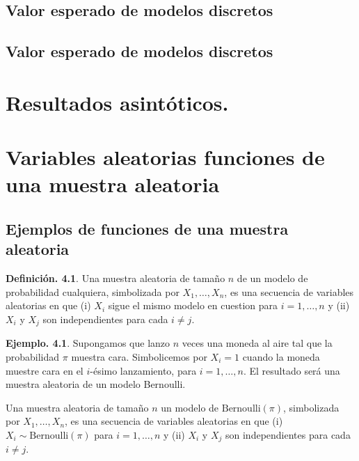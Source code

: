 \documentclass[]{book}
\theoremstyle{definition}
\newtheorem{definition}{Definición.}[chapter]
\theoremstyle{definition}
\newtheorem{example}{Ejemplo.}[chapter]
\theoremstyle{definition}
\theoremstyle{remark}
\begin{document}
\hypertarget{valor-esperado-de-modelos-discretos}{%
\section{Valor esperado de modelos discretos}\label{valor-esperado-de-modelos-discretos}}

\hypertarget{valor-esperado-de-modelos-discretos-1}{%
\section{Valor esperado de modelos discretos}\label{valor-esperado-de-modelos-discretos-1}}

\hypertarget{ass}{%
\chapter{Resultados asintóticos.}\label{ass}}

\hypertarget{xmuestras}{%
\chapter{Variables aleatorias funciones de una muestra aleatoria}\label{xmuestras}}

\hypertarget{ejemplos-de-funciones-de-una-muestra-aleatoria}{%
\section{Ejemplos de funciones de una muestra aleatoria}\label{ejemplos-de-funciones-de-una-muestra-aleatoria}}

\begin{definition}
\protect\hypertarget{def:unnamed-chunk-158}{}{\label{def:unnamed-chunk-158} }
Una muestra aleatoria de tamaño \(n\) de un modelo de probabilidad cualquiera,
simbolizada por \(X_1,\ldots, X_n\), es una secuencia de variables aleatorias
en que (i) \(X_i\) sigue el mismo modelo en cuestion para \(i=1,\ldots,n\) y
(ii) \(X_i\) y \(X_j\) son independientes para cada \(i \neq j\).
\end{definition}

\begin{example}
\protect\hypertarget{exm:unnamed-chunk-159}{}{\label{exm:unnamed-chunk-159} }
Supongamos que lanzo \(n\) veces una moneda al aire tal que la probabilidad
\(\pi\) muestra cara. Simbolicemos por \(X_i=1\) cuando la moneda muestre cara
en el \(i\)-ésimo lanzamiento, para \(i=1,\ldots,n\). El resultado será una
muestra aleatoria de un modelo Bernoulli.

Una muestra aleatoria de tamaño \(n\) un modelo de
\(\mbox{Bernoulli}(\pi)\),
simbolizada por \(X_1,\ldots, X_n\), es una secuencia de variables aleatorias
en que (i) \(X_i \sim \mbox{Bernoulli}(\pi)\) para \(i=1,\ldots,n\) y (ii)
\(X_i\) y \(X_j\) son independientes para cada \(i \neq j\).
\end{example}
\end{document}
